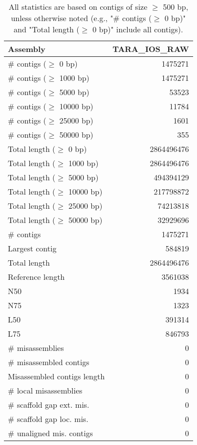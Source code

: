 \documentclass[12pt,a4paper]{article}
\begin{document}
\begin{table}[ht]
\begin{center}
\caption{All statistics are based on contigs of size $\geq$ 500 bp, unless otherwise noted (e.g., "\# contigs ($\geq$ 0 bp)" and "Total length ($\geq$ 0 bp)" include all contigs).}
\begin{tabular}{|l*{1}{|r}|}
\hline
Assembly & TARA\_IOS\_RAW \\ \hline
\# contigs ($\geq$ 0 bp) & 1475271 \\ \hline
\# contigs ($\geq$ 1000 bp) & 1475271 \\ \hline
\# contigs ($\geq$ 5000 bp) & 53523 \\ \hline
\# contigs ($\geq$ 10000 bp) & 11784 \\ \hline
\# contigs ($\geq$ 25000 bp) & 1601 \\ \hline
\# contigs ($\geq$ 50000 bp) & 355 \\ \hline
Total length ($\geq$ 0 bp) & 2864496476 \\ \hline
Total length ($\geq$ 1000 bp) & 2864496476 \\ \hline
Total length ($\geq$ 5000 bp) & 494394129 \\ \hline
Total length ($\geq$ 10000 bp) & 217798872 \\ \hline
Total length ($\geq$ 25000 bp) & 74213818 \\ \hline
Total length ($\geq$ 50000 bp) & 32929696 \\ \hline
\# contigs & 1475271 \\ \hline
Largest contig & 584819 \\ \hline
Total length & 2864496476 \\ \hline
Reference length & 3561038 \\ \hline
N50 & 1934 \\ \hline
N75 & 1323 \\ \hline
L50 & 391314 \\ \hline
L75 & 846793 \\ \hline
\# misassemblies & 0 \\ \hline
\# misassembled contigs & 0 \\ \hline
Misassembled contigs length & 0 \\ \hline
\# local misassemblies & 0 \\ \hline
\# scaffold gap ext. mis. & 0 \\ \hline
\# scaffold gap loc. mis. & 0 \\ \hline
\# unaligned mis. contigs & 0 \\ \hline

\end{tabular}
\end{center}
\end{table}
\end{document}
